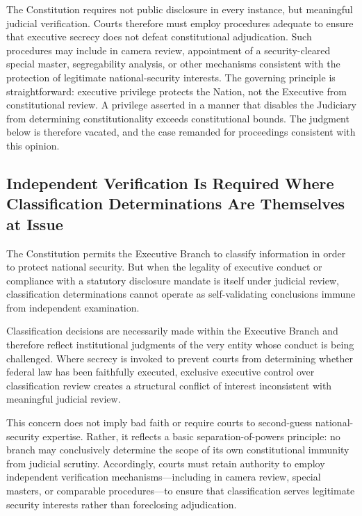 \documentclass[12pt]{article}
\begin{document}
The Constitution requires not public disclosure in every instance, but meaningful judicial verification.
Courts therefore must employ procedures adequate to ensure that executive secrecy does not defeat constitutional adjudication.
Such procedures may include in camera review, appointment of a security-cleared special master, segregability analysis, or other mechanisms consistent with the protection of legitimate national-security interests.
The governing principle is straightforward: executive privilege protects the Nation, not the Executive from constitutional review.
A privilege asserted in a manner that disables the Judiciary from determining constitutionality exceeds constitutional bounds.
The judgment below is therefore vacated, and the case remanded for proceedings consistent with this opinion.

\subsection*{Independent Verification Is Required Where Classification Determinations Are Themselves at Issue}

The Constitution permits the Executive Branch to classify information in order to protect national security.
But when the legality of executive conduct or compliance with a statutory disclosure mandate is itself under judicial review, classification determinations cannot operate as self-validating conclusions immune from independent examination.

Classification decisions are necessarily made within the Executive Branch and therefore reflect institutional judgments of the very entity whose conduct is being challenged.
Where secrecy is invoked to prevent courts from determining whether federal law has been faithfully executed, exclusive executive control over classification review creates a structural conflict of interest inconsistent with meaningful judicial review.

This concern does not imply bad faith or require courts to second-guess national-security expertise.
Rather, it reflects a basic separation-of-powers principle: no branch may conclusively determine the scope of its own constitutional immunity from judicial scrutiny.
Accordingly, courts must retain authority to employ independent verification mechanisms—including in camera review, special masters, or comparable procedures—to ensure that classification serves legitimate security interests rather than foreclosing adjudication.
\end{document}
